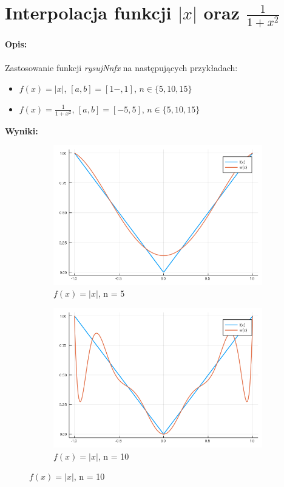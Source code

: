 \documentclass{article}
\begin{document}
\section*{Interpolacja funkcji $|x|$ oraz $\frac{1}{1+x^2}$}
\noindent \textbf{Opis: } \\\\
Zastosowanie funkcji \textit{rysujNnfx} na następujących przykładach:
\begin{itemize}
	\item $f(x) = |x|$, $[a,b] = [1-,1]$, $n \in \{5,10,15\}$
	\item $f(x) = \frac{1}{1+x^2}$, $[a,b] = [-5,5]$, $n \in \{5,10,15\}$
\end{itemize}
\noindent \textbf{Wyniki: }
\begin{figure}[ht]
	\begin{subfigure}{.5\textwidth}
		\centering
		\includegraphics[width=.8\linewidth]{plots/6_1.png}  
		\caption*{$f(x) = |x|$, n = 5}
	\end{subfigure}
	\begin{subfigure}{.5\textwidth}
		\centering
		\includegraphics[width=.8\linewidth]{plots/6_2.png}  
		\caption*{$f(x) = |x|$, n = 10}
	\end{subfigure}
\end{figure}
\end{document}
